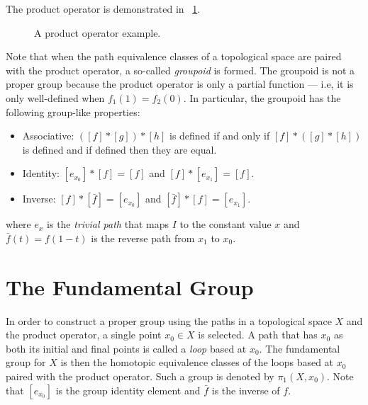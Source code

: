 \documentclass[letterpaper,12pt,fleqn]{article}
\begin{document}
The product operator is demonstrated in \figurename\ \ref{fig:product}.

\begin{figure}[H]
  \centering
  \caption{A product operator example.}
  \label{fig:product}
\end{figure}

Note that when the path equivalence classes of a topological space are paired with the product operator, a so-called
\emph{groupoid} is formed.  The groupoid is not a proper group because the product operator is only a partial
function --- i.e, it is only well-defined when \(f_1(1)=f_2(0)\).  In particular, the groupoid has the following
group-like properties:

\begin{itemize}
\item Associative: \(([f]*[g])*[h]\) is defined if and only if \([f]*([g]*[h])\) is defined and if defined then
  they are equal.
\item Identity: \([e_{x_0}]*[f]=[f]\) and \([f]*[e_{x_1}]=[f]\).
\item Inverse: \([f]*[\bar{f}]=[e_{x_0}]\) and \([\bar{f}]*[f]=[e_{x_1}]\).
\end{itemize}

where \(e_x\) is the \emph{trivial path} that maps \(I\) to the constant value \(x\) and \(\bar{f}(t)=f(1-t)\) is
the reverse path from \(x_1\) to \(x_0\).

\section*{The Fundamental Group}

In order to construct a proper group using the paths in a topological space \(X\) and the product operator, a
single point \(x_0\in X\) is selected.  A path that has \(x_0\) as both its initial and final points is called a
\emph{loop} based at \(x_0\).  The fundamental group for \(X\) is then the homotopic equivalence classes of the
loops based at \(x_0\) paired with the product operator.  Such a group is denoted by \(\pi_1(X,x_0)\).  Note
that \([e_{x_0}]\) is the group identity element and \(\bar{f}\) is the inverse of \(f\).
\end{document}
